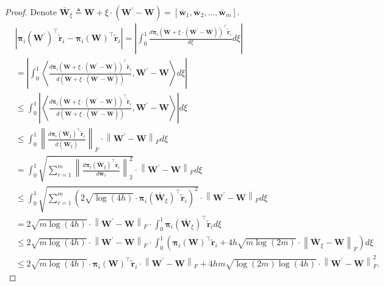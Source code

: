 \documentclass[10pt]{article}
\def\rvw{{\mathbf{w}}}
\def\rvtilder{{\tilde{\mathbf{r}}}}
\def\rvpi{{\boldsymbol{\pi}}}
\def\rmW{{\mathbf{W}}}
\begin{document}
\begin{proof}
Denote $\bar{\rmW}_\xi \triangleq \rmW +  \xi \cdot\left( \rmW^\prime - \rmW \right) = \left[ \bar{\rvw}_1, \bar{\rvw}_2, \dots, \bar{\rvw}_m \right]$.
\begin{equation*}
\begin{split}
    &\left| \rvpi_i\left( \rmW^\prime \right)^\top \rvtilder_i - \rvpi_i\left( \rmW \right)^\top \rvtilder_i \right| = \left| \int_{0}^{1} { \frac{ d \rvpi_i\left( \rmW +  \xi \cdot\left( \rmW^\prime - \rmW \right) \right)^\top \rvtilder_i }{d\xi} } d\xi \right| \\
    &= \left| \int_{0}^{1}{ \left\langle \frac{d \rvpi_i\left( \rmW +  \xi \cdot\left( \rmW^\prime - \rmW \right) \right)^\top \rvtilder_i }{d\left( \rmW +  \xi \cdot\left( \rmW^\prime - \rmW \right) \right)}, \rmW^\prime - \rmW \right\rangle d\xi} \right| \\
    &\le \int_{0}^{1}{ \left| \left\langle \frac{d \rvpi_i\left( \rmW +  \xi \cdot\left( \rmW^\prime - \rmW \right) \right)^\top \rvtilder_i }{d\left( \rmW +  \xi \cdot\left( \rmW^\prime - \rmW \right) \right)}, \rmW^\prime - \rmW \right\rangle \right| d\xi} \\
    &\le \int_{0}^{1}{  \left\| \frac{d \rvpi_i\left( \bar{\rmW}_\xi \right)^\top \rvtilder_i }{d\left( \bar{\rmW}_\xi \right)} \right\|_F \cdot \left\| \rmW^\prime - \rmW \right\|_F d\xi} \\
    &= \int_{0}^{1}{  \sqrt{ \sum\limits_{r=1}^{m}{\left\| \frac{d \rvpi_i\left( \bar{\rmW}_\xi \right)^\top \rvtilder_i }{d \bar{\rvw}_r}\right\|_2^2 } } \cdot \left\| \rmW^\prime - \rmW \right\|_F d\xi} \\
    &\le \int_{0}^{1}{  \sqrt{ \sum\limits_{r=1}^{m}{\left( 2 \sqrt{\log{\left(4h\right)}} \cdot \rvpi_i\left( \bar{\rmW}_\xi \right)^\top \rvtilder_i \right)^2 } } \cdot \left\| \rmW^\prime - \rmW \right\|_F d\xi} \\
    &= 2 \sqrt{m \log{\left(4h\right)}} \cdot \left\| \rmW^\prime - \rmW \right\|_F  \cdot \int_{0}^{1}{ \rvpi_i\left( \bar{\rmW}_\xi \right)^\top \rvtilder_i d\xi} \\
    &\le 2 \sqrt{m \log{\left(4h\right)}} \cdot \left\| \rmW^\prime - \rmW \right\|_F  \cdot \int_{0}^{1}{ \left( \rvpi_i\left( \rmW \right)^\top \rvtilder_i + 4 h \sqrt{m \log{\left(2m\right)}} \cdot \left\| \bar{\rmW}_\xi - \rmW \right\|_F \right) d\xi} \\
    &\le 2 \sqrt{m \log{\left(4h\right)}} \cdot \rvpi_i\left( \rmW \right)^\top \rvtilder_i \cdot \left\| \rmW^\prime - \rmW \right\|_F + 4 h m   \sqrt{\log{\left(2m\right)} \log{\left(4h\right)}} \cdot \left\| \rmW^\prime - \rmW \right\|_F^2.

\end{split}
\end{equation*}
\end{proof}
\end{document}
